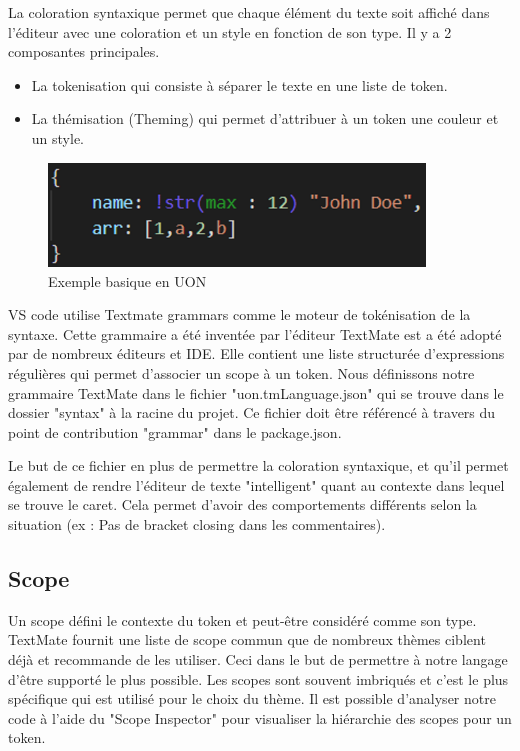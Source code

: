 \documentclass[
    iict, %
    il, %
]{heig-tb}
\begin{document}
La coloration syntaxique permet que chaque élément du texte soit affiché dans l'éditeur avec une coloration et un style en fonction de son type.
Il y a 2 composantes principales.
\begin{itemize}
    \item La tokenisation qui consiste à séparer le texte en une liste de token.
    \item La thémisation (Theming) qui permet d'attribuer à un token une couleur et un style.
\end{itemize}

\begin{figure}[!h]
    \begin{center}
        \includegraphics[width=10cm]{assets/figures/basic-uon.png}
    \end{center}
    \caption[code UON]{\label{basic-uon} Exemple basique en UON}
\end{figure}


VS code utilise Textmate grammars \cite{textmate-grammars} comme le moteur de tokénisation de la syntaxe.
Cette grammaire a été inventée par l'éditeur TextMate est a été adopté par de nombreux éditeurs et IDE.
Elle contient une liste structurée d'expressions régulières qui permet d'associer un scope à un token.
Nous définissons notre grammaire TextMate dans le fichier "uon.tmLanguage.json" qui  se trouve dans le dossier "syntax" à la racine du projet.
Ce fichier doit être référencé à travers du point de contribution "grammar" dans le package.json.

Le but de ce fichier en plus de permettre la coloration syntaxique, et qu'il permet également de rendre l'éditeur de texte "intelligent" quant au contexte dans lequel se trouve le caret. Cela permet d'avoir des comportements différents selon la situation (ex : Pas de bracket closing dans les commentaires).

\subsection{Scope}
Un scope défini le contexte du token et peut-être considéré comme son type.
TextMate fournit une liste de scope commun que de nombreux thèmes ciblent déjà et recommande de les utiliser. Ceci dans le but de permettre à notre langage d'être supporté le plus possible.
Les scopes sont souvent imbriqués et c'est le plus spécifique qui est utilisé pour le choix du thème.
Il est possible d'analyser notre code à l'aide du "Scope Inspector" pour visualiser la hiérarchie des scopes pour un token.
\end{document}
